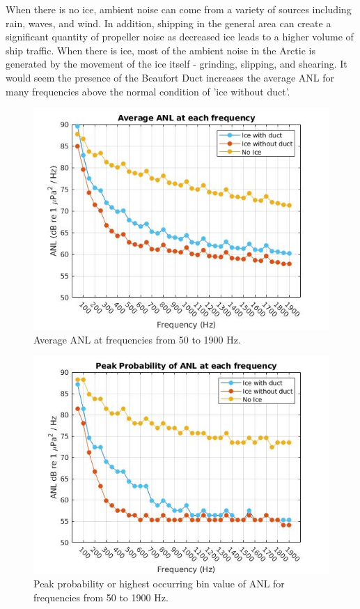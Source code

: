 When there is no ice, ambient noise can come from a variety of sources including rain, waves, and wind. In addition, shipping in the general area can create a significant quantity of propeller noise as decreased ice leads to a higher volume of ship traffic. \parencite{halliday2020potential} When there is ice, most of the ambient noise in the Arctic is generated by the movement of the ice itself - grinding, slipping, and shearing. It would seem the presence of the Beaufort Duct increases the average ANL for many frequencies above the normal condition of 'ice without duct'. 



\begin{figure}[p]
\centering
\includegraphics[scale=0.6]{Figures/Average_ANL.jpg}
\caption{Average ANL at frequencies from 50 to 1900 Hz.}
\label{fig_avg_anl}
\end{figure}

\begin{figure}[p]
\centering
\includegraphics[scale=0.6]{Figures/peak_prob_ANL.jpg}
\caption{Peak probability or highest occurring bin value of ANL for frequencies from 50 to 1900 Hz.}
\label{fig_peak_prob}
\end{figure}

